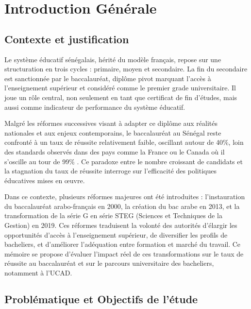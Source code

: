 \chapter*{Introduction Générale}

\section*{Contexte et justification}

Le système éducatif sénégalais, hérité du modèle français, repose sur une structuration en trois cycles : primaire, moyen et secondaire. 
La fin du secondaire est sanctionnée par le baccalauréat, diplôme pivot marquant l'accès à l'enseignement supérieur et considéré comme le premier grade universitaire. 
Il joue un rôle central, non seulement en tant que certificat de fin d’études, mais aussi comme indicateur de performance du système éducatif.

Malgré les réformes successives visant à adapter ce diplôme aux réalités nationales et aux enjeux contemporains, le baccalauréat au Sénégal reste confronté à un taux de réussite relativement faible, 
oscillant autour de 40\%, loin des standards observés dans des pays comme la France ou le Canada où il s'oscille au tour de 99\% \cite{Mbaye2023}. 
Ce paradoxe entre le nombre croissant de candidats et la stagnation du taux de réussite interroge sur l’efficacité des politiques éducatives mises en œuvre.

Dans ce contexte, plusieurs réformes majeures ont été introduites : l’instauration du baccalauréat arabo-français en 2000, la création du bac arabe en 2013, 
et la transformation de la série G en série STEG (Sciences et Techniques de la Gestion) en 2019. 
Ces réformes traduisent la volonté des autorités d’élargir les opportunités d’accès à l’enseignement supérieur, de diversifier les profils de bacheliers, 
et d'améliorer l'adéquation entre formation et marché du travail. Ce mémoire se propose d’évaluer l’impact réel de ces transformations sur le taux de réussite au baccalauréat et sur le parcours universitaire des bacheliers, notamment à l'UCAD.

\section*{Problématique et Objectifs de l'étude}

